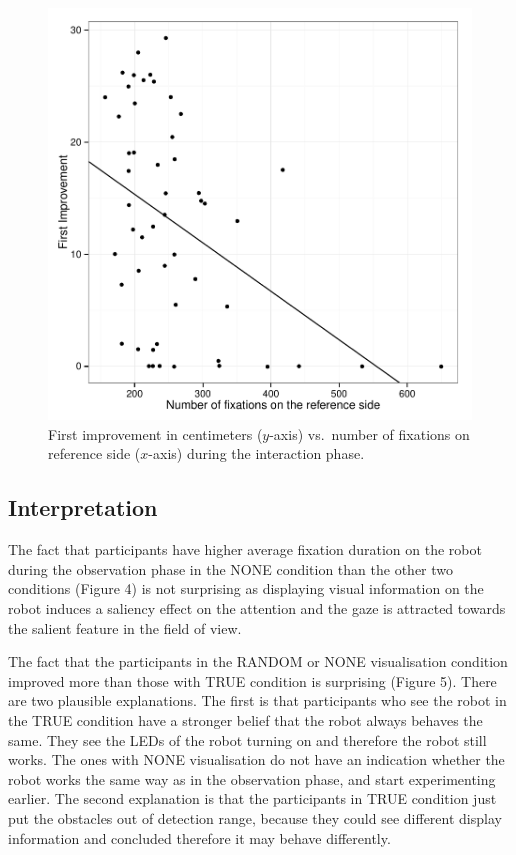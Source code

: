 \documentclass{sig-alternate}
\begin{document}
\begin{figure}[h!]
    \centering
    \includegraphics[width=0.8\linewidth]{corPlotFirstImprove}
    \caption{First improvement in centimeters ($y$-axis) vs.~number of fixations
    on reference side ($x$-axis) during the interaction phase.}
    \label{res4}
\end{figure}


\subsection{Interpretation}

The fact that participants have
higher average fixation duration on the robot during the observation phase in
the {\sf NONE} condition than the other two conditions (Figure 4) is not
surprising as displaying visual information on the robot induces a saliency
effect on the attention and the gaze is attracted towards the salient feature in
the field of view. 

The fact that the participants in the {\sf RANDOM} or {\sf NONE} visualisation
condition improved more than those with {\sf TRUE} condition is surprising
(Figure 5). There are two plausible explanations. The first is that participants
who see the robot in the {\sf TRUE} condition have a stronger belief that the
robot always behaves the same. They see the LEDs of the robot turning on and
therefore the robot still works. The ones with {\sf NONE} visualisation do not
have an indication whether the robot works the same way as in the observation
phase, and start experimenting earlier. The second explanation is that the
participants in {\sf TRUE} condition just put the obstacles out of detection
range, because they could see different display information and concluded
therefore it may behave differently.
\end{document}
